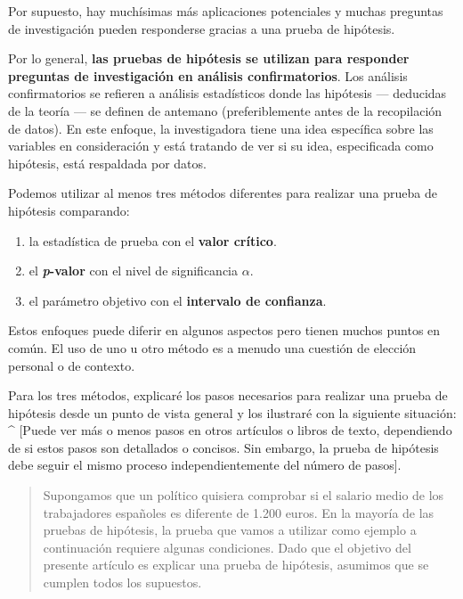 \documentclass[
]{book}
\providecommand{\tightlist}{%
  \setlength{\itemsep}{0pt}\setlength{\parskip}{0pt}}
\begin{document}
Por supuesto, hay muchísimas más aplicaciones potenciales y muchas preguntas de investigación pueden responderse gracias a una prueba de hipótesis.

Por lo general, \textbf{las pruebas de hipótesis se utilizan para responder preguntas de investigación en análisis confirmatorios}. Los análisis confirmatorios se refieren a análisis estadísticos donde las hipótesis --- deducidas de la teoría --- se definen de antemano (preferiblemente antes de la recopilación de datos). En este enfoque, la investigadora tiene una idea específica sobre las variables en consideración y está tratando de ver si su idea, especificada como hipótesis, está respaldada por datos.

Podemos utilizar al menos tres métodos diferentes para realizar una prueba de hipótesis comparando:

\begin{enumerate}
\def\labelenumi{\arabic{enumi}.}
\tightlist
\item
  la estadística de prueba con el \textbf{valor crítico}.
\item
  el \textbf{\emph{p}-valor} con el nivel de significancia \(\alpha\).
\item
  el parámetro objetivo con el \textbf{intervalo de confianza}.
\end{enumerate}

Estos enfoques puede diferir en algunos aspectos pero tienen muchos puntos en común. El uso de uno u otro método es a menudo una cuestión de elección personal o de contexto.

Para los tres métodos, explicaré los pasos necesarios para realizar una prueba de hipótesis desde un punto de vista general y los ilustraré con la siguiente situación: \^{} {[}Puede ver más o menos pasos en otros artículos o libros de texto, dependiendo de si estos pasos son detallados o concisos. Sin embargo, la prueba de hipótesis debe seguir el mismo proceso independientemente del número de pasos{]}.

\begin{quote}
Supongamos que un político quisiera comprobar si el salario medio de los trabajadores españoles es diferente de 1.200 euros.
En la mayoría de las pruebas de hipótesis, la prueba que vamos a utilizar como ejemplo a continuación requiere algunas condiciones. Dado que el objetivo del presente artículo es explicar una prueba de hipótesis, asumimos que se cumplen todos los supuestos.
\end{quote}
\end{document}
